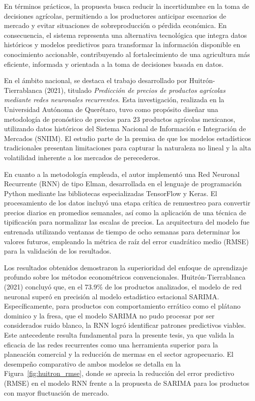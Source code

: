 \documentclass[12pt, a4paper]{report}
\begin{document}
En términos prácticos, la propuesta busca reducir la incertidumbre en la toma de decisiones agrícolas, permitiendo a los productores anticipar escenarios de mercado y evitar situaciones de sobreproducción o pérdida económica. En consecuencia, el sistema representa una alternativa tecnológica que integra datos históricos y modelos predictivos para transformar la información disponible en conocimiento accionable, contribuyendo al fortalecimiento de una agricultura más eficiente, informada y orientada a la toma de decisiones basada en datos.

En el ámbito nacional, se destaca el trabajo desarrollado por Huitrón-Tierrablanca (2021), titulado \textit{Predicción de precios de productos agrícolas mediante redes neuronales recurrentes}. Esta investigación, realizada en la Universidad Autónoma de Querétaro, tuvo como propósito diseñar una metodología de pronóstico de precios para 23 productos agrícolas mexicanos, utilizando datos históricos del Sistema Nacional de Información e Integración de Mercados (SNIIM). El estudio parte de la premisa de que los modelos estadísticos tradicionales presentan limitaciones para capturar la naturaleza no lineal y la alta volatilidad inherente a los mercados de perecederos.

En cuanto a la metodología empleada, el autor implementó una Red Neuronal Recurrente (RNN) de tipo Elman, desarrollada en el lenguaje de programación Python mediante las bibliotecas especializadas TensorFlow y Keras. El procesamiento de los datos incluyó una etapa crítica de remuestreo para convertir precios diarios en promedios semanales, así como la aplicación de una técnica de tipificación para normalizar las escalas de precios. La arquitectura del modelo fue entrenada utilizando ventanas de tiempo de ocho semanas para determinar los valores futuros, empleando la métrica de raíz del error cuadrático medio (RMSE) para la validación de los resultados.

Los resultados obtenidos demostraron la superioridad del enfoque de aprendizaje profundo sobre los métodos econométricos convencionales. Huitrón-Tierrablanca (2021) concluyó que, en el 73.9\% de los productos analizados, el modelo de red neuronal superó en precisión al modelo estadístico estacional SARIMA. Específicamente, para productos con comportamiento errático como el plátano dominico y la fresa, que el modelo SARIMA no pudo procesar por ser considerados ruido blanco, la RNN logró identificar patrones predictivos viables. Este antecedente resulta fundamental para la presente tesis, ya que valida la eficacia de las redes recurrentes como una herramienta superior para la planeación comercial y la reducción de mermas en el sector agropecuario. El desempeño comparativo de ambos modelos se detalla en la Figura~\ref{fig:huitron_rmse}, donde se aprecia la reducción del error predictivo (RMSE) en el modelo RNN frente a la propuesta de SARIMA para los productos con mayor fluctuación de mercado.
\end{document}
